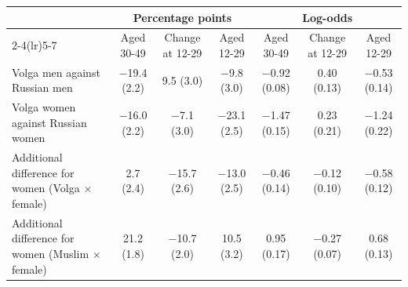 \begin{tabular}{lcccccc}
\toprule
 & \multicolumn{3}{c}{Percentage points} & \multicolumn{3}{c}{Log-odds} \\
\cmidrule(lr){2-4}\cmidrule(lr){5-7}
 & Aged 30-49 & Change at 12-29 & Aged 12-29 & Aged 30-49 & Change at 12-29 & Aged 12-29 \\
\midrule
Volga men against Russian men & $-$19.4 (2.2) & 9.5 (3.0) & $-$9.8 (3.0) & $-$0.92 (0.08) & 0.40 (0.13) & $-$0.53 (0.14) \\
Volga women against Russian women & $-$16.0 (2.2) & $-$7.1 (3.0) & $-$23.1 (2.5) & $-$1.47 (0.15) & 0.23 (0.21) & $-$1.24 (0.22) \\
Additional difference for women (Volga $\times$ female) & 2.7 (2.4) & $-$15.7 (2.6) & $-$13.0 (2.5) & $-$0.46 (0.14) & $-$0.12 (0.10) & $-$0.58 (0.12) \\
Additional difference for women (Muslim $\times$ female) & 21.2 (1.8) & $-$10.7 (2.0) & 10.5 (3.2) & 0.95 (0.17) & $-$0.27 (0.07) & 0.68 (0.13) \\
\bottomrule
\end{tabular}
